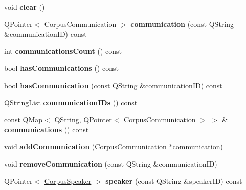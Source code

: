 \begin{DoxyCompactItemize}
\item 
\mbox{\label{class_corpus_a84087660b16d31d547ea3e7dc1b45088}} 
void {\bfseries clear} ()
\item 
\mbox{\label{class_corpus_a5f63f21382d9a9c0de14d31df01c8bab}} 
Q\+Pointer$<$ \hyperlink{class_corpus_communication}{Corpus\+Communication} $>$ {\bfseries communication} (const Q\+String \&communication\+ID) const
\item 
\mbox{\label{class_corpus_aa5a929a8e3d10b5851a7ba6ad064c12a}} 
int {\bfseries communications\+Count} () const
\item 
\mbox{\label{class_corpus_aae5348f25de705df3cb6e7ddbb1cf186}} 
bool {\bfseries has\+Communications} () const
\item 
\mbox{\label{class_corpus_a52ba6fa1f3c0ecad726d8426d209800a}} 
bool {\bfseries has\+Communication} (const Q\+String \&communication\+ID) const
\item 
\mbox{\label{class_corpus_aef989baa3a11224defcd318e9aa32d1f}} 
Q\+String\+List {\bfseries communication\+I\+Ds} () const
\item 
\mbox{\label{class_corpus_a69e0227e1b170f27ae30fdddf858427f}} 
const Q\+Map$<$ Q\+String, Q\+Pointer$<$ \hyperlink{class_corpus_communication}{Corpus\+Communication} $>$ $>$ \& {\bfseries communications} () const
\item 
\mbox{\label{class_corpus_a26f495a4c45cb80de5ca8260caf1253e}} 
void {\bfseries add\+Communication} (\hyperlink{class_corpus_communication}{Corpus\+Communication} $\ast$communication)
\item 
\mbox{\label{class_corpus_a1a30199fd871a0a5508dc8fd836cbc15}} 
void {\bfseries remove\+Communication} (const Q\+String \&communication\+ID)
\item 
\mbox{\label{class_corpus_ad8bf012af653dc02f0a2704f52d3c098}} 
Q\+Pointer$<$ \hyperlink{class_corpus_speaker}{Corpus\+Speaker} $>$ {\bfseries speaker} (const Q\+String \&speaker\+ID) const
\item 

\end{DoxyCompactItemize}
